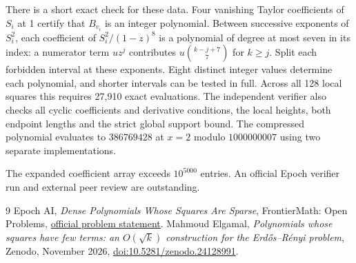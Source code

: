 \documentclass[11pt]{article}
\begin{document}
There is a short exact check for these data. Four vanishing Taylor coefficients of $S_i$ at 1 certify that $B_{v_i}$ is an integer polynomial. Between successive exponents of $S_i^2$, each coefficient of $S_i^2/(1-z)^8$ is a polynomial of degree at most seven in its index: a numerator term $u z^j$ contributes $u\binom{k-j+7}{7}$ for $k\geq j$. Split each forbidden interval at these exponents. Eight distinct integer values determine each polynomial, and shorter intervals can be tested in full. Across all 128 local squares this requires 27,910 exact evaluations. The independent verifier also checks all cyclic coefficients and derivative conditions, the local heights, both endpoint lengths and the strict global support bound. The compressed polynomial evaluates to $386769428$ at $x=2$ modulo $1000000007$ using two separate implementations.

The expanded coefficient array exceeds $10^{5000}$ entries. An official Epoch verifier run and external peer review are outstanding.

\begin{thebibliography}{9}
 Epoch AI, \emph{Dense Polynomials Whose Squares Are Sparse}, FrontierMath: Open Problems, \href{https://epoch.ai/frontiermath/open-problems/polynomial-square-few-coefficients}{official problem statement}.
 Mahmoud Elgamal, \emph{Polynomials whose squares have few terms: an $O(\sqrt{k})$ construction for the Erd\H{o}s--R\'enyi problem}, Zenodo, November 2026, \href{https://doi.org/10.5281/zenodo.24128991}{doi:10.5281/zenodo.24128991}.
\end{thebibliography}
\end{document}
